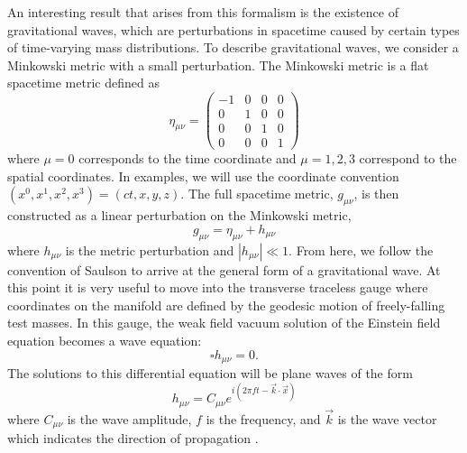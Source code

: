 An interesting result that arises from this formalism is the 
existence of gravitational waves, which are perturbations in 
spacetime caused by certain types of time-varying mass distributions. 
To describe gravitational waves, we consider 
a Minkowski metric with a small perturbation. The Minkowski metric 
is a flat spacetime metric defined as
\begin{equation}
\eta_{\mu\nu} = 
  \begin{pmatrix}
   -1 & 0 & 0 & 0 \\
    0 & 1 & 0 & 0 \\
    0 & 0 & 1 & 0 \\
    0 & 0 & 0 & 1
  \end{pmatrix}
\end{equation}
where $\mu = 0$ corresponds to the time coordinate and $\mu = {1,2,3}$ 
correspond to the spatial coordinates. In examples, we will use the coordinate 
convention $(x^0,x^1,x^2,x^3) = (ct,x,y,z)$. 
The full spacetime metric, $g_{\mu\nu}$, is then constructed as a 
linear perturbation on the Minkowski metric,
\begin{equation}
g_{\mu\nu} = \eta_{\mu\nu} + h_{\mu\nu}
\end{equation}
where $h_{\mu\nu}$ is the metric perturbation and $|h_{\mu\nu}| \ll 1$.
From here, we follow the convention of Saulson \cite{Saulson:1994} to arrive at the general 
form of a gravitational wave.
At this point it is very useful to move into the transverse traceless 
gauge where coordinates on the manifold are defined by the geodesic 
motion of freely-falling test masses. In this gauge, the weak field 
vacuum solution of the Einstein field equation becomes a wave equation: 
\begin{equation}
\square h_{\mu\nu} = 0.
\end{equation}
The solutions to this differential equation will be plane waves of 
the form
\begin{equation}
h_{\mu\nu} = C_{\mu\nu}e^{i(2\pi ft - \vec{k}\cdot\vec{x})}
\end{equation}
where $C_{\mu\nu}$ is the wave amplitude, $f$ is the frequency, 
and $\vec{k}$ is the wave vector which indicates the direction of 
propagation \cite{Carroll}.

